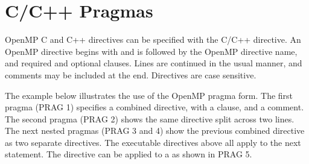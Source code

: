 \section{C/C++ Pragmas}
\label{sec:pragmas}

OpenMP C and C++ directives can be specified with the C/C++  directive.
An OpenMP directive begins with  and is followed by the 
OpenMP directive name, and required and optional clauses. Lines are continued in the 
usual manner, and comments may be included at the end.
Directives are case sensitive.

The example below illustrates the use of the OpenMP pragma form.
The first pragma (PRAG 1) specifies a combined  
directive, with a  clause, and a comment. 
The second pragma (PRAG 2) shows the same directive split
across two lines. The next nested pragmas (PRAG 3 and 4) show the previous combined directive as 
two separate directives. The executable directives above all apply to the next 
statement. The  directive can be applied to a 
as shown in PRAG 5.

